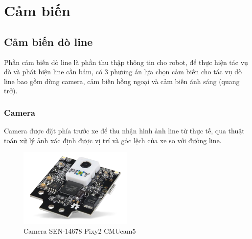 





    \section{Cảm biến}
        \subsection{Cảm biến dò line}
            \hspace*{0.6cm}Phần cảm biến dò line là phần thu thập thông tin cho robot, để thực hiện tác vụ dò và
            phát hiện line cần bám, có 3 phương án lựa chọn cảm biến cho tác vụ dò line bao gồm dùng camera, cảm
            biến hồng ngoại và cảm biến ánh sáng (quang trở).
            \subsubsection{Camera}
            \hspace*{0.6cm}Camera được đặt phía trước xe để thu nhận hình ảnh line từ thực tế, qua thuật toán
        xử lý ảnh xác định được vị trí và góc lệch của xe so với đường line.
            \begin{figure}[H]
                \centering
                \includegraphics[width=0.5\textwidth]{pictures/chapter1/chapter1_pic15_camera.png}
                \caption{Camera SEN-14678 Pixy2 CMUcam5}
                \label{chap1_pic15}
            \end{figure}
